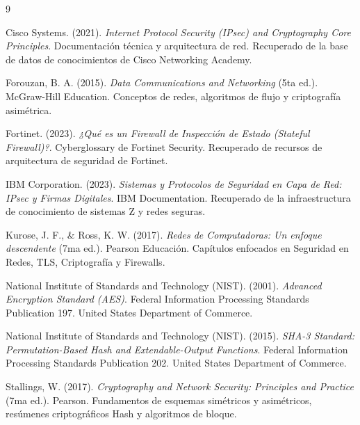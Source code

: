 \documentclass[a4paper,12pt]{article}
\begin{document}
\newpage

\begin{thebibliography}{9}

    Cisco Systems. (2021). \textit{Internet Protocol Security (IPsec) and Cryptography Core Principles}. Documentación técnica y arquitectura de red. Recuperado de la base de datos de conocimientos de Cisco Networking Academy.
    
    Forouzan, B. A. (2015). \textit{Data Communications and Networking} (5ta ed.). McGraw-Hill Education. Conceptos de redes, algoritmos de flujo y criptografía asimétrica.
    
    Fortinet. (2023). \textit{¿Qué es un Firewall de Inspección de Estado (Stateful Firewall)?}. Cyberglossary de Fortinet Security. Recuperado de recursos de arquitectura de seguridad de Fortinet.
    
    IBM Corporation. (2023). \textit{Sistemas y Protocolos de Seguridad en Capa de Red: IPsec y Firmas Digitales}. IBM Documentation. Recuperado de la infraestructura de conocimiento de sistemas Z y redes seguras.
    
    Kurose, J. F., \& Ross, K. W. (2017). \textit{Redes de Computadoras: Un enfoque descendente} (7ma ed.). Pearson Educación. Capítulos enfocados en Seguridad en Redes, TLS, Criptografía y Firewalls.
    
    National Institute of Standards and Technology (NIST). (2001). \textit{Advanced Encryption Standard (AES)}. Federal Information Processing Standards Publication 197. United States Department of Commerce.
    
    National Institute of Standards and Technology (NIST). (2015). \textit{SHA-3 Standard: Permutation-Based Hash and Extendable-Output Functions}. Federal Information Processing Standards Publication 202. United States Department of Commerce.
    
    Stallings, W. (2017). \textit{Cryptography and Network Security: Principles and Practice} (7ma ed.). Pearson. Fundamentos de esquemas simétricos y asimétricos, resúmenes criptográficos Hash y algoritmos de bloque.

\end{thebibliography}
\end{document}

